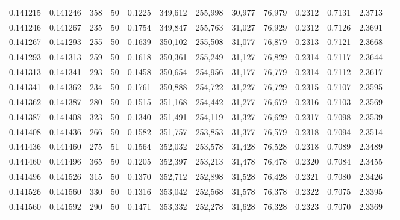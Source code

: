 \begin{tabular}{rrrrrrrrrrrrr}
0.141215 & 0.141246 &   358 &  50 &                                     0.1225 & 349,612 & 255,998 &  30,977 &  76,979 & 0.2312 & 0.7131 & 2.3713 \\
0.141246 & 0.141267 &   235 &  50 &                                     0.1754 & 349,847 & 255,763 &  31,027 &  76,929 & 0.2312 & 0.7126 & 2.3691 \\
0.141267 & 0.141293 &   255 &  50 &                                     0.1639 & 350,102 & 255,508 &  31,077 &  76,879 & 0.2313 & 0.7121 & 2.3668 \\
0.141293 & 0.141313 &   259 &  50 &                                     0.1618 & 350,361 & 255,249 &  31,127 &  76,829 & 0.2314 & 0.7117 & 2.3644 \\
0.141313 & 0.141341 &   293 &  50 &                                     0.1458 & 350,654 & 254,956 &  31,177 &  76,779 & 0.2314 & 0.7112 & 2.3617 \\
0.141341 & 0.141362 &   234 &  50 &                                     0.1761 & 350,888 & 254,722 &  31,227 &  76,729 & 0.2315 & 0.7107 & 2.3595 \\
0.141362 & 0.141387 &   280 &  50 &                                     0.1515 & 351,168 & 254,442 &  31,277 &  76,679 & 0.2316 & 0.7103 & 2.3569 \\
0.141387 & 0.141408 &   323 &  50 &                                     0.1340 & 351,491 & 254,119 &  31,327 &  76,629 & 0.2317 & 0.7098 & 2.3539 \\
0.141408 & 0.141436 &   266 &  50 &                                     0.1582 & 351,757 & 253,853 &  31,377 &  76,579 & 0.2318 & 0.7094 & 2.3514 \\
0.141436 & 0.141460 &   275 &  51 &                                     0.1564 & 352,032 & 253,578 &  31,428 &  76,528 & 0.2318 & 0.7089 & 2.3489 \\
0.141460 & 0.141496 &   365 &  50 &                                     0.1205 & 352,397 & 253,213 &  31,478 &  76,478 & 0.2320 & 0.7084 & 2.3455 \\
0.141496 & 0.141526 &   315 &  50 &                                     0.1370 & 352,712 & 252,898 &  31,528 &  76,428 & 0.2321 & 0.7080 & 2.3426 \\
0.141526 & 0.141560 &   330 &  50 &                                     0.1316 & 353,042 & 252,568 &  31,578 &  76,378 & 0.2322 & 0.7075 & 2.3395 \\
0.141560 & 0.141592 &   290 &  50 &                                     0.1471 & 353,332 & 252,278 &  31,628 &  76,328 & 0.2323 & 0.7070 & 2.3369 \\

\end{tabular}
